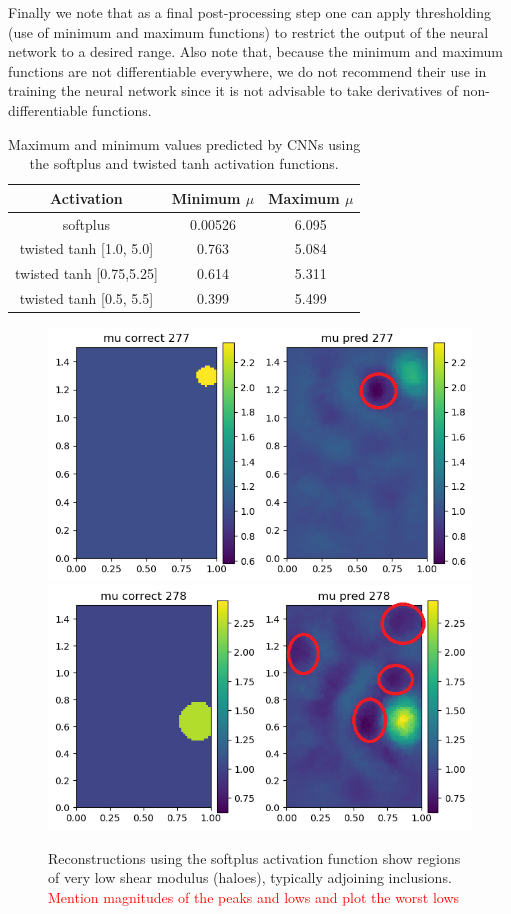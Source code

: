 \documentclass[12pt]{article}
\begin{document}
Finally we note that as a final post-processing step one can apply thresholding (use of minimum and maximum functions) to restrict the output of the neural network to a desired range. Also note that, because the minimum and maximum functions are not differentiable everywhere, we do not recommend their use in training the neural network since it is not advisable to take derivatives of non-differentiable functions.
%
\begin{table}
  \centering
  \begin{tabular}{|c|c|c|}
    \hline
    Activation & Minimum $\mu$ & Maximum $\mu$ \\
    \hline
    softplus   & 0.00526       & 6.095  \\
    \hline
    twisted tanh [1.0, 5.0]  & 0.763  & 5.084\\
    \hline
    twisted tanh [0.75,5.25] & 0.614  & 5.311\\
    \hline
    twisted tanh [0.5, 5.5]  & 0.399  & 5.499\\
    \hline
  \end{tabular}
  \caption{\label{table:muminmax} Maximum and minimum values predicted by CNNs using the softplus and twisted tanh activation functions.}
\end{table}
\begin{figure}[h]
  \centering
    \includegraphics[totalheight=3.9cm]{Figures/softplus_halos/mucomp277.png}
    \includegraphics[totalheight=3.9cm]{Figures/softplus_halos/mucomp278.png}
  \caption{\label{fig:softplushalos} Reconstructions using the softplus activation function show regions of very low shear modulus (haloes), typically adjoining inclusions. \textcolor{red}{Mention magnitudes of the peaks and lows and plot the worst lows}}
\end{figure}
\end{document}
